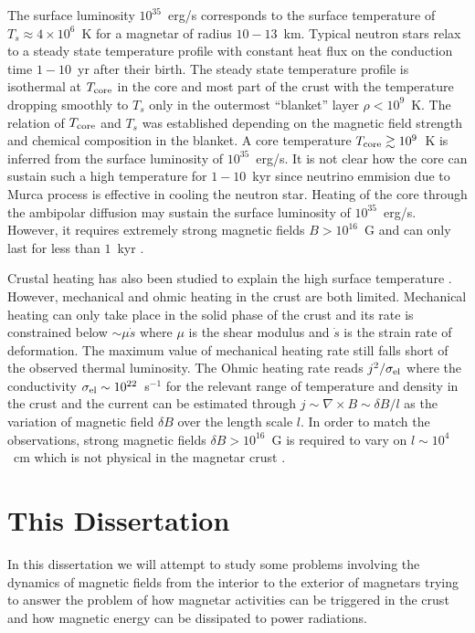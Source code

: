 The surface luminosity $10^{35}$~erg/s corresponds to the surface temperature of $T_s\approx 4\times 10^6$~K for a magnetar of radius $10-13$~km.
Typical neutron stars relax to a steady state temperature profile with constant heat flux on the conduction time $1-10$~yr after their birth.
The steady state temperature profile is isothermal at $T_{\rm core}$ in the core and most part of the crust with the temperature dropping smoothly to $T_s$ only in the outermost ``blanket'' layer $\rho<10^9$~K.
The relation of $T_{\rm core}$ and $T_s$ was established \citep{2003ApJ...594..404P} depending on the magnetic field strength and chemical composition in the blanket.
A core temperature $T_{\rm core}\gtrsim 10^9$~K is inferred from the surface luminosity of $10^{35}$~erg/s.
It is not clear how the core can sustain such a high temperature for $1-10$~kyr since neutrino emmision due to Murca process is effective in cooling the neutron star.
Heating of the core through the ambipolar diffusion may sustain the surface luminosity of $10^{35}$~erg/s. However, it requires extremely strong magnetic fields $B>10^{16}$~G and can only last for less than $1$~kyr \citep{2016ApJ...833..261B}.

Crustal heating has also been studied to explain the high surface temperature \citep{2014MNRAS.442.3484K}.
However, mechanical and ohmic heating in the crust are both limited.
Mechanical heating can only take place in the solid phase of the crust and its rate is constrained below $\sim\mu\dot{s}$ where $\mu$ is the shear modulus and $\dot{s}$ is the strain rate of deformation.
The maximum value of mechanical heating rate still falls short of the observed thermal luminosity.
The Ohmic heating rate reads $j^2/\sigma_{\rm el}$ where the conductivity $\sigma_{\rm el}\sim 10^{22}$~s$^{-1}$ for the relevant range of temperature and density in the crust \citep{2015SSRv..191..239P} and the current can be estimated through $j\sim \nabla\times B\sim \delta B/l$ as the variation of magnetic field $\delta B$ over the length scale $l$.
In order to match the observations, strong magnetic fields $\delta B>10^{16}$~G is required to vary on $l\sim 10^{4}$~cm which is not physical in the magnetar crust \citep{2016ApJ...833..261B}.

\section{This Dissertation}
\label{sec:intro-outline}

In this dissertation we will attempt to study some problems involving the dynamics of magnetic fields from the interior to the exterior of magnetars trying to answer the problem of how magnetar activities can be triggered in the crust and how magnetic energy can be dissipated to power radiations.

